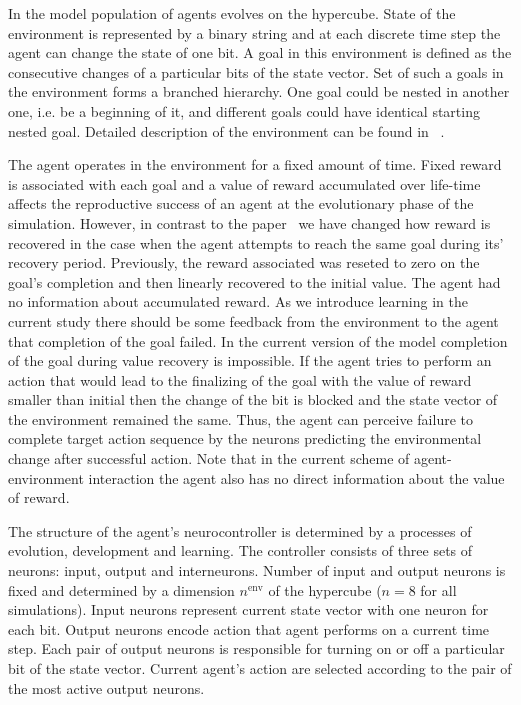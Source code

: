 \documentclass[letterpaper]{article}
\begin{document}
In the model population of agents evolves on the hypercube. State of the environment is represented by a binary string and at each discrete time step the agent can change the state of one bit. A goal in this environment is defined as the consecutive changes of a particular bits of the state vector. Set of such a goals in the environment forms a branched hierarchy. One goal could be nested in another one, i.e. be a beginning of it, and different goals could have identical starting nested goal. Detailed description of the environment can be found in ~\citep{LakhmanBurtsev2013}.

The agent operates in the environment for a fixed amount of time. Fixed reward is associated with each goal and a value of reward accumulated over life-time affects the reproductive success of an agent at the evolutionary phase of the simulation. However, in contrast to the paper~\citep{LakhmanBurtsev2013} we have changed how reward is recovered in the case when the agent attempts to reach the same goal during its' recovery period. Previously, the reward associated was reseted to zero on the goal's completion and then linearly recovered to the initial value. The agent had no information about accumulated reward. As we introduce learning in the current study there should be some feedback from the environment to the agent that completion of the goal failed. In the current version of the model completion of the goal during value recovery is impossible. If the agent tries to perform an action that would lead to the finalizing of the goal with the value of reward smaller than initial then the change of the bit is blocked and the state vector of the environment remained the same. Thus, the agent can perceive failure to complete target action sequence by the neurons predicting the environmental change after successful action. Note that in the current scheme of agent-environment interaction the agent also has no direct information about the value of reward.

 The structure of the agent's neurocontroller is determined by a processes of evolution, development and learning. The controller consists of three sets of neurons: input, output and interneurons. Number of input and output neurons is fixed and determined by a dimension $n^{\mathrm{env}}$ of the hypercube ($n=8$ for all simulations). Input neurons represent current state vector with one neuron for each bit. Output neurons encode action that agent performs on a current time step. Each pair of output neurons is responsible for turning on or off a particular bit of the state vector. Current agent's action are selected according to the pair of the most active output neurons. 
 
\end{document}

